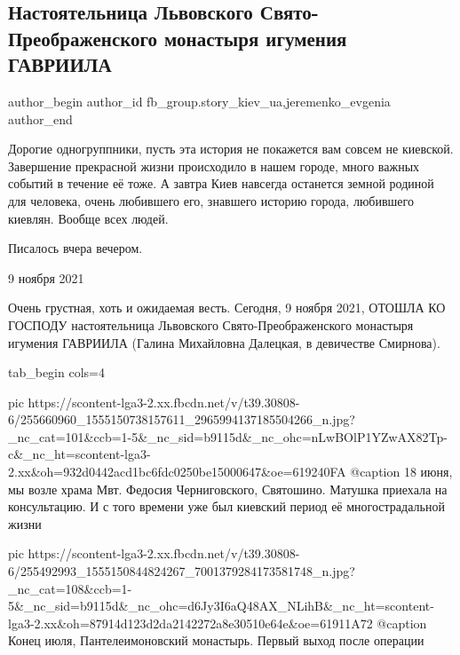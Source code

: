  
 
 
 
 
 
\subsection{Настоятельница Львовского Свято-Преображенского монастыря игумения ГАВРИИЛА}
\label{sec:10_11_2021.fb.fb_group.story_kiev_ua.3.igumenia_gavriila}
 
\ifcmt
 author_begin
   author_id fb_group.story_kiev_ua,jeremenko_evgenia
 author_end
\fi

Дорогие одногруппники, пусть эта история не покажется вам совсем не киевской.
Завершение прекрасной жизни происходило в нашем городе, много важных событий в
течение её тоже. А завтра Киев навсегда останется земной родиной для человека,
очень любившего его, знавшего историю города, любившего киевлян. Вообще всех
людей. 

Писалось вчера вечером.

9 ноября 2021

Очень грустная, хоть и ожидаемая весть. Сегодня, 9 ноября 2021,  ОТОШЛА КО
ГОСПОДУ настоятельница Львовского Свято-Преображенского монастыря игумения
ГАВРИИЛА (Галина Михайловна Далецкая, в девичестве Смирнова).

\ifcmt
  tab_begin cols=4

     pic https://scontent-lga3-2.xx.fbcdn.net/v/t39.30808-6/255660960_1555150738157611_2965994137185504266_n.jpg?_nc_cat=101&ccb=1-5&_nc_sid=b9115d&_nc_ohc=nLwBOlP1YZwAX82Tp-c&_nc_ht=scontent-lga3-2.xx&oh=932d0442acd1bc6fdc0250be15000647&oe=619240FA
		 @caption 18 июня, мы возле храма Мвт. Федосия Черниговского, Святошино. Матушка приехала на консультацию. И с того времени уже был киевский период её многострадальной жизни

     pic https://scontent-lga3-2.xx.fbcdn.net/v/t39.30808-6/255492993_1555150844824267_7001379284173581748_n.jpg?_nc_cat=108&ccb=1-5&_nc_sid=b9115d&_nc_ohc=d6Jy3I6aQ48AX_NLihB&_nc_ht=scontent-lga3-2.xx&oh=87914d123d2da2142272a8e30510e64e&oe=61911A72
		 @caption Конец июля, Пантелеимоновский монастырь. Первый выход после операции

